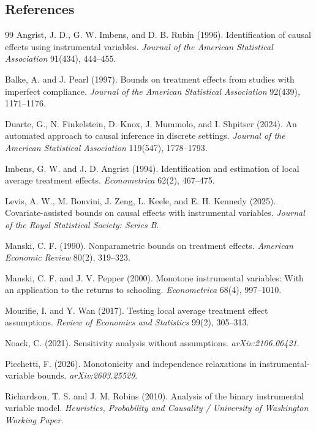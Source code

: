\documentclass[11pt]{article}
\theoremstyle{definition}
\theoremstyle{plain}
\theoremstyle{remark}
\begin{document}
\subsection*{References}
\begin{thebibliography}{99}
Angrist, J. D., G. W. Imbens, and D. B. Rubin (1996).
Identification of causal effects using instrumental variables.
\emph{Journal of the American Statistical Association} 91(434), 444--455.

Balke, A. and J. Pearl (1997).
Bounds on treatment effects from studies with imperfect compliance.
\emph{Journal of the American Statistical Association} 92(439), 1171--1176.

Duarte, G., N. Finkelstein, D. Knox, J. Mummolo, and I. Shpitser (2024).
An automated approach to causal inference in discrete settings.
\emph{Journal of the American Statistical Association} 119(547), 1778--1793.

Imbens, G. W. and J. D. Angrist (1994).
Identification and estimation of local average treatment effects.
\emph{Econometrica} 62(2), 467--475.

Levis, A. W., M. Bonvini, J. Zeng, L. Keele, and E. H. Kennedy (2025).
Covariate-assisted bounds on causal effects with instrumental variables.
\emph{Journal of the Royal Statistical Society: Series B}.

Manski, C. F. (1990).
Nonparametric bounds on treatment effects.
\emph{American Economic Review} 80(2), 319--323.

Manski, C. F. and J. V. Pepper (2000).
Monotone instrumental variables: With an application to the returns to schooling.
\emph{Econometrica} 68(4), 997--1010.

Mourifie, I. and Y. Wan (2017).
Testing local average treatment effect assumptions.
\emph{Review of Economics and Statistics} 99(2), 305--313.

Noack, C. (2021).
Sensitivity analysis without assumptions.
\emph{arXiv:2106.06421}.

Picchetti, F. (2026).
Monotonicity and independence relaxations in instrumental-variable bounds.
\emph{arXiv:2603.25529}.

Richardson, T. S. and J. M. Robins (2010).
Analysis of the binary instrumental variable model.
\emph{Heuristics, Probability and Causality / University of Washington Working Paper}.


\end{thebibliography}
\end{document}
